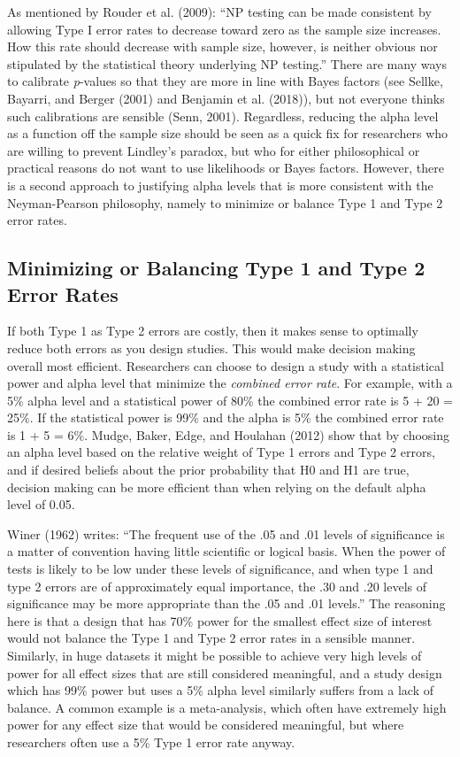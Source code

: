 \documentclass[,jou,floatsintext]{apa6}
\begin{document}
As mentioned by Rouder et al. (2009): \enquote{NP testing can be made consistent by allowing Type I error rates to decrease toward zero as the sample size increases. How this rate should decrease with sample size, however, is neither obvious nor stipulated by the statistical theory underlying NP testing.} There are many ways to calibrate \emph{p}-values so that they are more in line with Bayes factors (see Sellke, Bayarri, and Berger (2001) and Benjamin et al. (2018)), but not everyone thinks such calibrations are sensible (Senn, 2001). Regardless, reducing the alpha level as a function off the sample size should be seen as a quick fix for researchers who are willing to prevent Lindley's paradox, but who for either philosophical or practical reasons do not want to use likelihoods or Bayes factors. However, there is a second approach to justifying alpha levels that is more consistent with the Neyman-Pearson philosophy, namely to minimize or balance Type 1 and Type 2 error rates.

\hypertarget{minimizing-or-balancing-type-1-and-type-2-error-rates}{%
\subsection{Minimizing or Balancing Type 1 and Type 2 Error Rates}\label{minimizing-or-balancing-type-1-and-type-2-error-rates}}

If both Type 1 as Type 2 errors are costly, then it makes sense to optimally reduce both errors as you design studies. This would make decision making overall most efficient. Researchers can choose to design a study with a statistical power and alpha level that minimize the \emph{combined error rate}. For example, with a 5\% alpha level and a statistical power of 80\% the combined error rate is 5 + 20 = 25\%. If the statistical power is 99\% and the alpha is 5\% the combined error rate is 1 + 5 = 6\%. Mudge, Baker, Edge, and Houlahan (2012) show that by choosing an alpha level based on the relative weight of Type 1 errors and Type 2 errors, and if desired beliefs about the prior probability that H0 and H1 are true, decision making can be more efficient than when relying on the default alpha level of 0.05.

Winer (1962) writes: \enquote{The frequent use of the .05 and .01 levels of significance is a matter of convention having little scientific or logical basis. When the power of tests is likely to be low under these levels of significance, and when type 1 and type 2 errors are of approximately equal importance, the .30 and .20 levels of significance may be more appropriate than the .05 and .01 levels.} The reasoning here is that a design that has 70\% power for the smallest effect size of interest would not balance the Type 1 and Type 2 error rates in a sensible manner. Similarly, in huge datasets it might be possible to achieve very high levels of power for all effect sizes that are still considered meaningful, and a study design which has 99\% power but uses a 5\% alpha level similarly suffers from a lack of balance. A common example is a meta-analysis, which often have extremely high power for any effect size that would be considered meaningful, but where researchers often use a 5\% Type 1 error rate anyway.
\end{document}
